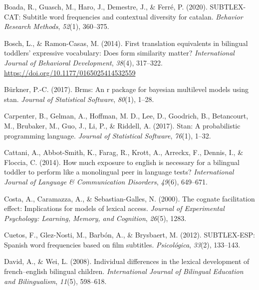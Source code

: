 \documentclass[
  letterpaper,
  DIV=11,
  numbers=noendperiod]{scrartcl}
\newlength{\cslhangindent}
\newlength{\cslentryspacingunit} %
\newenvironment{CSLReferences}[2] %
 {%
  \setlength{\parindent}{0pt}
  \ifodd #1
  \let\oldpar\par
  \def\par{\hangindent=\cslhangindent\oldpar}
  \fi
  \setlength{\parskip}{#2\cslentryspacingunit}
 }%
 {}
\begin{document}
\begin{CSLReferences}{1}{0}
\leavevmode{}%
Boada, R., Guasch, M., Haro, J., Demestre, J., \& Ferré, P. (2020).
SUBTLEX-CAT: Subtitle word frequencies and contextual diversity for
catalan. \emph{Behavior Research Methods}, \emph{52}(1), 360--375.

\leavevmode{}%
Bosch, L., \& Ramon-Casas, M. (2014). First translation equivalents in
bilingual toddlers' expressive vocabulary: {Does} form similarity
matter? \emph{International Journal of Behavioral Development},
\emph{38}(4), 317--322. \url{https://doi.org/10.1177/0165025414532559}

\leavevmode{}%
Bürkner, P.-C. (2017). Brms: An r package for bayesian multilevel models
using stan. \emph{Journal of Statistical Software}, \emph{80}(1), 1--28.

\leavevmode{}%
Carpenter, B., Gelman, A., Hoffman, M. D., Lee, D., Goodrich, B.,
Betancourt, M., Brubaker, M., Guo, J., Li, P., \& Riddell, A. (2017).
Stan: A probabilistic programming language. \emph{Journal of Statistical
Software}, \emph{76}(1), 1--32.

\leavevmode{}%
Cattani, A., Abbot-Smith, K., Farag, R., Krott, A., Arreckx, F., Dennis,
I., \& Floccia, C. (2014). How much exposure to english is necessary for
a bilingual toddler to perform like a monolingual peer in language
tests? \emph{International Journal of Language \& Communication
Disorders}, \emph{49}(6), 649--671.

\leavevmode{}%
Costa, A., Caramazza, A., \& Sebastian-Galles, N. (2000). The cognate
facilitation effect: Implications for models of lexical access.
\emph{Journal of Experimental Psychology: Learning, Memory, and
Cognition}, \emph{26}(5), 1283.

\leavevmode{}%
Cuetos, F., Glez-Nosti, M., Barbón, A., \& Brysbaert, M. (2012).
SUBTLEX-ESP: Spanish word frequencies based on film subtitles.
\emph{Psicol{ó}gica}, \emph{33}(2), 133--143.

\leavevmode{}%
David, A., \& Wei, L. (2008). Individual differences in the lexical
development of french--english bilingual children. \emph{International
Journal of Bilingual Education and Bilingualism}, \emph{11}(5),
598--618.


\end{CSLReferences}
\end{document}

